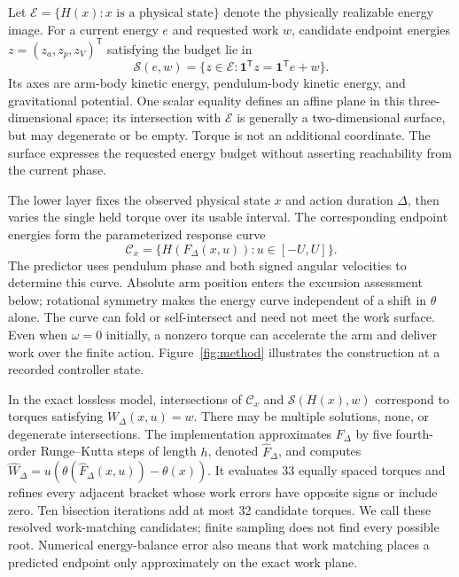 \documentclass[letterpaper,10pt,conference]{ieeeconf}
\begin{document}
Let $\mathcal E=\{H(x):x\text{ is a physical state}\}$ denote the physically realizable energy image. For a current energy $e$ and requested work $w$, candidate endpoint energies $z=(z_a,z_p,z_V)^{\mathsf T}$ satisfying the budget lie in
\begin{equation}
 \mathcal S(e,w)=\{z\in\mathcal E:\boldsymbol{1}^{\mathsf T}z
       =\boldsymbol{1}^{\mathsf T}e+w\}.
 \label{eq:surface}
\end{equation}
Its axes are arm-body kinetic energy, pendulum-body kinetic energy, and gravitational potential. One scalar equality defines an affine plane in this three-dimensional space; its intersection with $\mathcal E$ is generally a two-dimensional surface, but may degenerate or be empty. Torque is not an additional coordinate. The surface expresses the requested energy budget without asserting reachability from the current phase.

The lower layer fixes the observed physical state $x$ and action duration $\Delta$, then varies the single held torque over its usable interval. The corresponding endpoint energies form the parameterized response curve
\begin{equation}
 \mathcal C_x=\{H(F_\Delta(x,u)):u\in[-U,U]\}.
 \label{eq:curve}
\end{equation}
The predictor uses pendulum phase and both signed angular velocities to determine this curve. Absolute arm position enters the excursion assessment below; rotational symmetry makes the energy curve independent of a shift in $\theta$ alone. The curve can fold or self-intersect and need not meet the work surface. Even when $\omega=0$ initially, a nonzero torque can accelerate the arm and deliver work over the finite action. Figure~\ref{fig:method} illustrates the construction at a recorded controller state.

In the exact lossless model, intersections of $\mathcal C_x$ and $\mathcal S(H(x),w)$ correspond to torques satisfying $W_\Delta(x,u)=w$. There may be multiple solutions, none, or degenerate intersections. The implementation approximates $F_\Delta$ by five fourth-order Runge--Kutta steps of length $h$, denoted $\widehat F_\Delta$, and computes $\widehat W_\Delta=u(\theta(\widehat F_\Delta(x,u))-\theta(x))$. It evaluates 33 equally spaced torques and refines every adjacent bracket whose work errors have opposite signs or include zero. Ten bisection iterations add at most 32 candidate torques. We call these resolved work-matching candidates; finite sampling does not find every possible root. Numerical energy-balance error also means that work matching places a predicted endpoint only approximately on the exact work plane.
\end{document}
